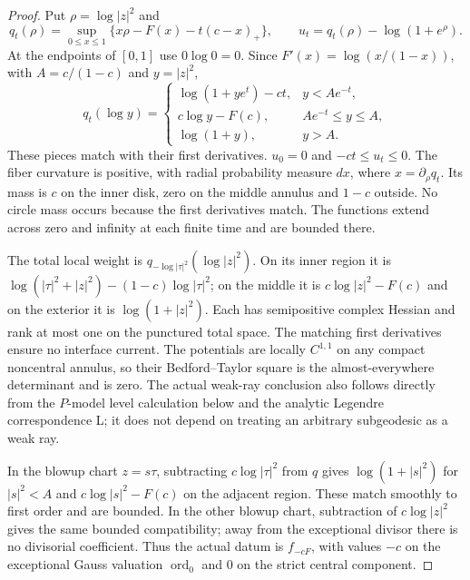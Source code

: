 \documentclass[11pt]{article}
\newcommand{\ord}{\operatorname{ord}}
\theoremstyle{remark}\newtheorem{remark}[theorem]{Remark}
\begin{document}
\begin{proof}
Put $\rho=\log|z|^2$ and
\[
 q_t(\rho)=\sup_{0\leq x\leq1}
       \{x\rho-F(x)-t(c-x)_+\},\qquad
 u_t=q_t(\rho)-\log(1+e^\rho).
\]
At the endpoints of $[0,1]$ use $0\log0=0$. Since
$F'(x)=\log(x/(1-x))$, with $A=c/(1-c)$ and $y=|z|^2$,
\[
 q_t(\log y)=\begin{cases}
 \log(1+ye^t)-ct,&y<Ae^{-t},\\
 c\log y-F(c),&Ae^{-t}\leq y\leq A,\\
 \log(1+y),&y>A.
 \end{cases}
\]
These pieces match with their first derivatives. $u_0=0$ and
$-ct\leq u_t\leq0$. The fiber curvature is positive, with radial
probability measure $d x$, where $x=\partial_\rho q_t$.
Its mass is $c$ on the inner disk, zero on the middle annulus and
$1-c$ outside. No circle mass occurs because the first derivatives
match. The functions extend across zero and infinity at each finite
time and are bounded there.

The total local weight is $q_{-\log|\tau|^2}(\log|z|^2)$.
On its inner region it is
$\log(|\tau|^2+|z|^2)-(1-c)\log|\tau|^2$;
on the middle it is $c\log|z|^2-F(c)$ and on the exterior it is
$\log(1+|z|^2)$. Each has semipositive complex Hessian and rank at
most one on the punctured total space. The matching first derivatives
ensure no interface current. The potentials are locally
$C^{1,1}$ on any compact noncentral annulus, so their
Bedford--Taylor square is the almost-everywhere determinant and is
zero. The actual weak-ray conclusion also follows directly from the
$P$-model level calculation below and the analytic Legendre
correspondence L; it does not depend on treating an arbitrary
subgeodesic as a weak ray.

In the blowup chart $z=s\tau$, subtracting $c\log|\tau|^2$
from $q$ gives $\log(1+|s|^2)$ for $|s|^2<A$ and
$c\log|s|^2-F(c)$ on the adjacent region. These match smoothly to
first order and are bounded. In the other blowup chart, subtraction
of $c\log|z|^2$ gives the same bounded compatibility; away from the
exceptional divisor there is no divisorial coefficient. Thus the
actual datum is $f_{-cF}$, with values $-c$ on the exceptional Gauss
valuation $\ord_0$ and $0$ on the strict central component.


\end{proof}
\end{document}
